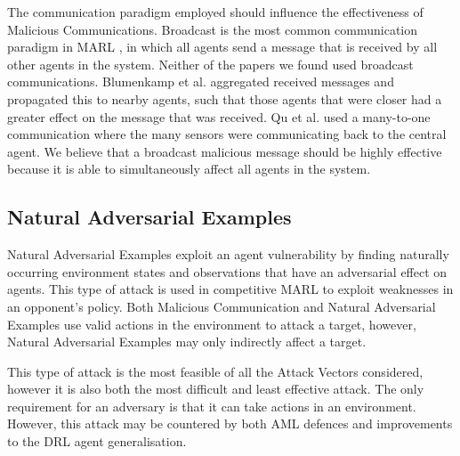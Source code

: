 \documentclass[conference,compsoc]{IEEEtran}
\begin{document}
The communication paradigm employed should influence the effectiveness of Malicious Communications. Broadcast is the most common communication paradigm in MARL \cite{zhu_survey_2022}, in which all agents send a message that is received by all other agents in the system. Neither of the papers we found used broadcast communications. Blumenkamp et al. \cite{blumenkamp_emergence_2021} aggregated received messages and propagated this to nearby agents, such that those agents that were closer had a greater effect on the message that was received. Qu et al. \cite{qu_attacking_2021} used a many-to-one communication where the many sensors were communicating back to the central agent. We believe that a broadcast malicious message should be highly effective because it is able to simultaneously affect all agents in the system.


\subsection{Natural Adversarial Examples}

Natural Adversarial Examples exploit an agent vulnerability by finding naturally occurring environment states and observations that have an adversarial effect on agents. This type of attack is used in competitive MARL to exploit weaknesses in an opponent's policy. Both Malicious Communication and Natural Adversarial Examples use valid actions in the environment to attack a target, however, Natural Adversarial Examples may only indirectly affect a target.

This type of attack is the most feasible of all the Attack Vectors considered, however it is also both the most difficult and least effective  attack. The only requirement for an adversary is that it can take actions in an environment. However, this attack may be countered by both AML defences and improvements to the DRL agent generalisation.
\end{document}

